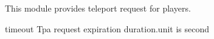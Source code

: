 
This module provides teleport request for players.



\begin{Configuration}
    \item[timeout]{
        Tpa request expiration duration.unit is second
    }
\end{Configuration}

